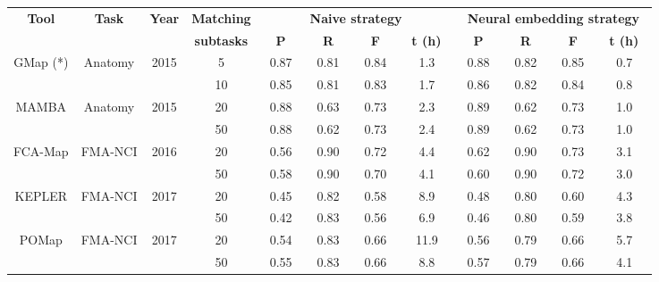 {
\centering

\begin{scriptsize}
\begin{tabular}{|c|c|c|c||c|c|c|c||c|c|c|c|}
\hline

\multirow{2}{*}{\textbf{Tool}} & \multirow{2}{*}{\textbf{Task}} & 
\multirow{2}{*}{\textbf{Year}}
& 
\textbf{Matching} 
& \multicolumn{4}{c||}{\textbf{Naive
strategy}} & \multicolumn{4}{c|}{\textbf{Neural embedding
strategy}}\\\cline{5-12}

& & & \textbf{subtasks} &
~\textbf{P}~ &
~\textbf{R}~ &  ~\textbf{F}~ &  ~\textbf{t (h)~} &
~\textbf{P}~ &
~\textbf{R}~ &  ~\textbf{F}~ &  ~\textbf{t (h)~}
\\\hline\hline

\multirow{2}{*}{GMap (*)} & \multirow{2}{*}{Anatomy} & \multirow{2}{*}{2015} 
& 5 & 0.87 & 0.81 & 0.84 & 1.3 & 0.88 & 0.82 & 0.85 & 0.7\\
& & & 10 & 0.85 & 0.81 & 0.83 &	1.7 & 0.86 & 0.82 & 0.84 & 0.8
\\\hline\hline

\multirow{2}{*}{MAMBA} & \multirow{2}{*}{Anatomy} & \multirow{2}{*}{2015} & 
20 & ~0.88~ & ~0.63~ & ~0.73~ & 2.3 & ~0.89~ & ~0.62~ & ~0.73~ & 1.0  \\
& & & 50 & 0.88 & 0.62 & 0.73 & 2.4 & 0.89 & 0.62 & 0.73 & 1.0
\\\hline\hline


\multirow{2}{*}{FCA-Map} & \multirow{2}{*}{FMA-NCI} & \multirow{2}{*}{2016} 
& 20 & 0.56 & 0.90 & 0.72 & 4.4 &  0.62 & 0.90 & 0.73 & 3.1 \\
& & & 50 & 0.58 & 0.90 & 0.70 &	4.1 & 0.60 & 0.90 & 0.72 & 3.0 \\\hline\hline


\multirow{2}{*}{KEPLER} & \multirow{2}{*}{FMA-NCI} & \multirow{2}{*}{2017} 
& 20 & 0.45 & 0.82 & 0.58 & 8.9 & 0.48 & 0.80 &	0.60 & 4.3\\
& & & 50 & 0.42 & 0.83 & 0.56 & 6.9 & 0.46 & 0.80 & 0.59 & 3.8
\\\hline\hline

\multirow{2}{*}{POMap} & \multirow{2}{*}{FMA-NCI} & \multirow{2}{*}{2017} 
& 20 & 0.54 & 0.83 & 0.66 &	11.9 & 0.56 & 0.79 & 0.66 & 5.7\\ 
& & & 50 & 0.55 & 0.83 & 0.66 & 8.8 & 0.57 & 0.79 & 0.66 & 4.1 \\\hline

 
\end{tabular}
\end{scriptsize}
}